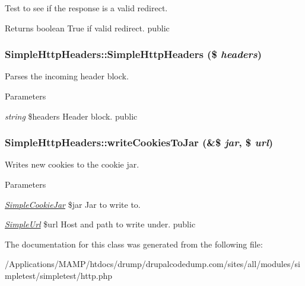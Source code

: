 \label{class_simple_http_headers_a23809f4cdd1c076084b41b254f4e7408}
Test to see if the response is a valid redirect. \begin{DoxyReturn}{Returns}
boolean True if valid redirect.  public 
\end{DoxyReturn}
\hypertarget{class_simple_http_headers_a95d838d8a7d3964295b444bfe61b454d}{
\subsubsection[{SimpleHttpHeaders}]{\setlength{\rightskip}{0pt plus 5cm}SimpleHttpHeaders::SimpleHttpHeaders (\$ {\em headers})}}
\label{class_simple_http_headers_a95d838d8a7d3964295b444bfe61b454d}
Parses the incoming header block. 
\begin{DoxyParams}{Parameters}
\item[{\em string}]\$headers Header block.  public \end{DoxyParams}
\hypertarget{class_simple_http_headers_af217cff62220f93102086b2edc595fee}{
\subsubsection[{writeCookiesToJar}]{\setlength{\rightskip}{0pt plus 5cm}SimpleHttpHeaders::writeCookiesToJar (\&\$ {\em jar}, \/  \$ {\em url})}}
\label{class_simple_http_headers_af217cff62220f93102086b2edc595fee}
Writes new cookies to the cookie jar. 
\begin{DoxyParams}{Parameters}
\item[{\em \hyperlink{class_simple_cookie_jar}{SimpleCookieJar}}]\$jar Jar to write to. \item[{\em \hyperlink{class_simple_url}{SimpleUrl}}]\$url Host and path to write under.  public \end{DoxyParams}


The documentation for this class was generated from the following file:\begin{DoxyCompactItemize}
\item 
/Applications/MAMP/htdocs/drump/drupalcodedump.com/sites/all/modules/simpletest/simpletest/http.php\end{DoxyCompactItemize}
